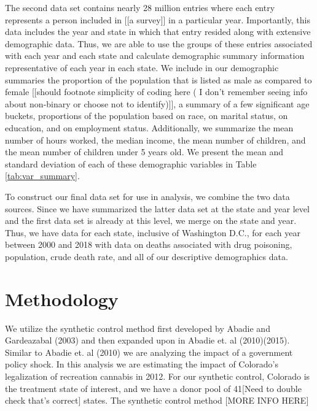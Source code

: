 \documentclass{article}
\begin{document}
The second data set contains nearly 28 million entries where each entry represents a person included in [[a survey]] in a particular year.  Importantly, this data includes the year and state in which that entry resided along with extensive demographic data. Thus, we are able to use the groups of these entries associated with each year and each state and calculate demographic summary information representative of each year in each state. We include in our demographic summaries the proportion of the population that is listed as male as compared to female [[should footnote simplicity of coding here ( I don't remember seeing info about non-binary or choose not to identify)]], a summary of a few significant age buckets, proportions of the population based on race, on marital status, on education, and on employment status. Additionally, we summarize the mean number of hours worked, the median income, the mean number of children, and the mean number of children under 5 years old. We present the mean and standard deviation of each of these demographic variables in Table \ref{tab:var_summary}.

To construct our final data set for use in analysis, we combine the two data sources. Since we have summarized the latter data set at the state and year level and the first data set is already at this level, we merge on the state and year. Thus, we have data for each state, inclusive of Washington D.C., for each year between 2000 and 2018 with data on deaths associated with drug poisoning, population, crude death rate, and all of our descriptive demographics data.



\section{Methodology}

We utilize the synthetic control method first developed by Abadie and Gardeazabal (2003) and then expanded upon in Abadie et. al (2010)(2015). Similar to Abadie et. al (2010) we are analyzing the impact of a government policy shock. In this analysis we are estimating the impact of Colorado's legalization of recreation cannabis in 2012. For our synthetic control, Colorado is the treatment state of interest, and we have a donor pool of 41[Need to double check that's correct] states. The synthetic control method [MORE INFO HERE]
\end{document}

